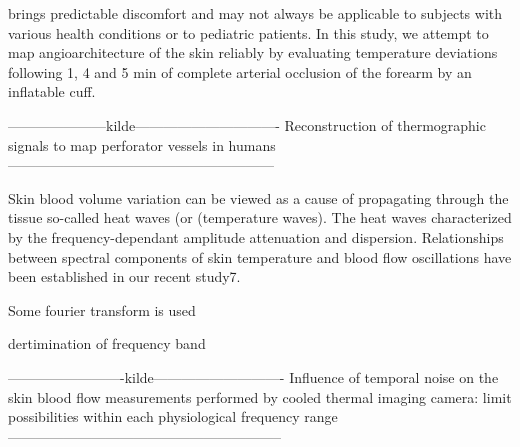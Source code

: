 brings predictable discomfort and may not always be applicable to subjects with various
health conditions or to pediatric patients. In this study, we attempt to map angioarchitecture
of the skin reliably by evaluating temperature deviations following 1, 4 and 5 min of complete
arterial occlusion of the forearm by an inflatable cuff.

---------------------kilde-------------------------------
Reconstruction of thermographic signals to map perforator vessels in
humans
--------------------------------------------------------- 



Skin blood volume variation can be viewed as a cause of propagating through the tissue so-called heat waves (or
(temperature waves). The heat waves characterized by the frequency-dependant amplitude attenuation and dispersion.
Relationships between spectral components of skin temperature and blood flow oscillations have been established in our
recent study7.


Some fourier transform is used 

dertimination of frequency band 

-------------------------kilde----------------------------
Influence of temporal noise on the skin blood flow measurements
performed by cooled thermal imaging camera:
limit possibilities within each physiological frequency range
-----------------------------------------------------------